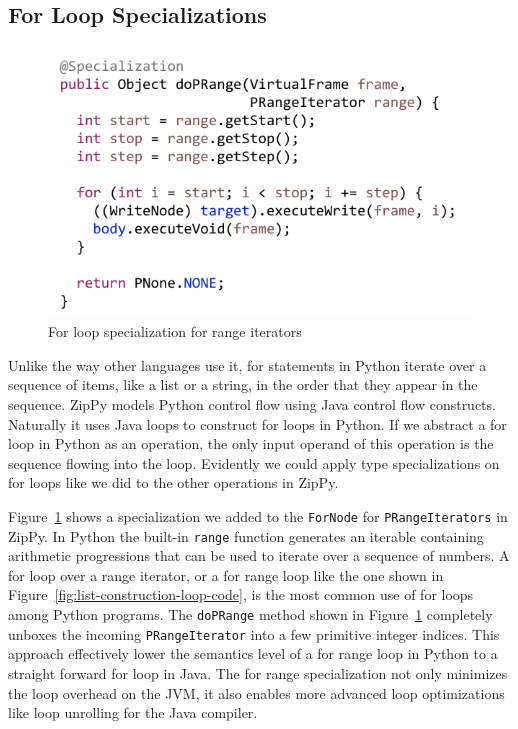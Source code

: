 \subsection{For Loop Specializations}

\begin{figure}
\centering
\includegraphics[scale=.9]{figures/ch3-for-range-node-code.pdf}
\caption{For loop specialization for range iterators}
\label{fig:for-range-node}
\end{figure}

Unlike the way other languages use it, for statements in Python iterate over a sequence of items, like a list or a string, in the order that they appear in the sequence.
ZipPy models Python control flow using Java control flow constructs.
Naturally it uses Java loops to construct for loops in Python.
If we abstract a for loop in Python as an operation, the only input operand of this operation is the sequence flowing into the loop.
Evidently we could apply type specializations on for loops like we did to the other operations in ZipPy.

Figure~\ref{fig:for-range-node} shows a specialization we added to the \texttt{ForNode} for \texttt{PRangeIterators} in ZipPy.
In Python the built-in \texttt{range} function generates an iterable containing arithmetic progressions that can be used to iterate over a sequence of numbers.
A for loop over a range iterator, or a for range loop like the one shown in Figure~\ref{fig:list-construction-loop-code}, is the most common use of for loops among Python programs.
The \texttt{doPRange} method shown in Figure~\ref{fig:for-range-node} completely unboxes the incoming \texttt{PRangeIterator} into a few primitive integer indices.
This approach effectively lower the semantics level of a for range loop in Python to a straight forward for loop in Java.
The for range specialization not only minimizes the loop overhead on the JVM, it also enables more advanced loop optimizations like loop unrolling for the Java compiler.

